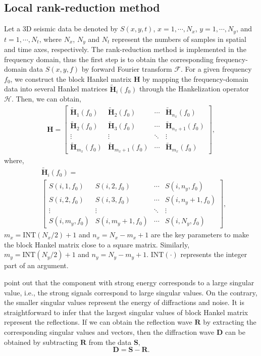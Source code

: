 \documentclass[10pt]{IEEEtran}
\begin{document}
\subsection{Local rank-reduction method}
Let a 3D seismic data be denoted by $S(x, y, t)$, $x=1,\cdots, N_x$, $y=1,\cdots, N_y$, and $t=1,\cdots, N_t$, where $N_x$, $N_y$ and $N_t$ represent the numbers of samples in spatial and time axes, respectively. The rank-reduction method \cite{2011Simultaneous,weilin2016dmssa} is implemented in the frequency domain, thus the first step is to obtain the corresponding frequency-domain data $S(x, y,f )$  by forward Fourier transform $\mathcal{F}$. For a given frequency $f_0$, we construct the block Hankel matrix $\mathbf{{H}}$ by mapping the frequency-domain data into several Hankel matrices $\mathbf{\widetilde{H}}_i(f_0)$ through the Hankelization operator $\mathcal{H}$. Then, we can obtain,
\begin{align} \label{eq:B} 
\mathbf{{H}}=
\begin{bmatrix}
\mathbf{\widetilde{H}}_1(f_0)&\mathbf{\widetilde{H}}_2(f_0)&\cdots&\mathbf{\widetilde{H}}_{n_x}(f_0)\\
\mathbf{\widetilde{H}}_2(f_0)&\mathbf{\widetilde{H}}_3(f_0)&\cdots&\mathbf{\widetilde{H}}_{n_x+1}(f_0)\\
\vdots&\vdots&\ddots&\vdots\\
\mathbf{\widetilde{H}}_{m_x}(f_0)&\mathbf{\widetilde{H}}_{m_x+1}(f_0)&\cdots&\mathbf{\widetilde{H}}_{m_x}(f_0)
\end{bmatrix}
,
\end{align}
where, 
\begin{align} \label{eq:Hif} 
&\mathbf{\widetilde{H}}_i(f_0)=\\
&\begin{bmatrix}
S(i,1,f_0)&S(i,2,f_0)&\cdots&S(i,n_y,f_0)\\
S(i,2,f_0)&S(i,3,f_0)&\cdots&S(i,n_y+1,f_0)\\
\vdots&\vdots&\ddots&\vdots\\
S(i,m_y,f_0)&S(i,m_y+1,f_0)&\cdots&S(i,N_y,f_0)
\end{bmatrix}
,
\end{align}
$m_x=\text{INT}(N_x/2)+1$ and $n_x=N_x-m_x+1$ are the key parameters to make the block Hankel matrix close to a square matrix. Similarly, $m_y=\text{INT}(N_y/2)+1$ and $n_y=N_y-m_y+1$.  $\text{INT}(\cdot)$ represents the integer part of an argument. 

\cite{Zheng2014A} point out that the component with strong energy corresponds to a large singular value, i.e., the strong signals correspond to large singular values. On the contrary, the smaller singular values represent the energy of diffractions and noise. 
It is straightforward to infer that the largest singular values of block Hankel matrix represent the reflections.  If we can obtain the reflection wave $\mathbf{R}$ by extracting the corresponding singular values and vectors, then the diffraction wave $\mathbf{D}$ can be obtained by subtracting $\mathbf{R}$ from the data $\mathbf{S}$,
\begin{equation}\label{eq:dsr}
\mathbf{D}=\mathbf{S}-\mathbf{R}.
\end{equation}
\end{document}
